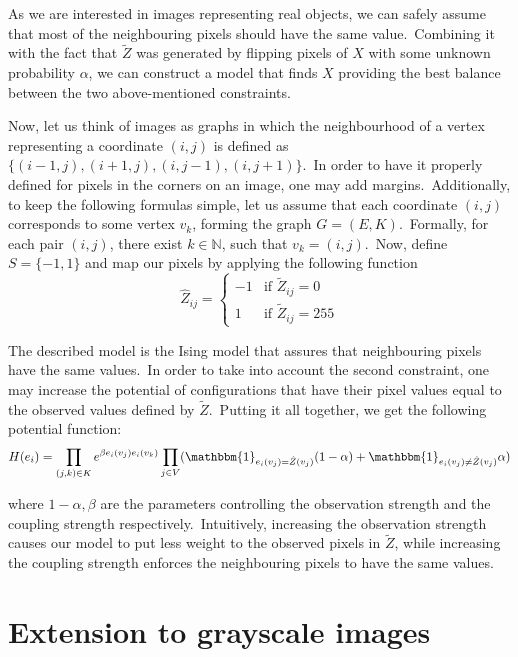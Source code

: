 \documentclass[shortabstract, english, lic]{iithesis}
\theoremstyle{default_theorem_style}\newtheorem{theorem}{Theorem}
\theoremstyle{default_theorem_style}\newtheorem{definition}{Definition}
\begin{document}
\noindent As we are interested in images representing real objects, we can safely assume that most of the neighbouring
pixels should have the same value.\ Combining it with the fact that $\tilde{Z}$ was generated by flipping pixels of
$X$ with some unknown probability $\alpha$, we can construct a model that finds $X$ providing the best balance between the
two above-mentioned constraints.\newline

\noindent Now, let us think of images as graphs in which the neighbourhood of a vertex representing a
coordinate $(i, j)$ is defined as $\{(i - 1, j), (i + 1, j), (i, j - 1), (i, j + 1)\}$.\ In
order to have it properly defined for pixels in the corners on an image, one may add margins.\ Additionally, to keep
the following formulas simple, let us assume that each coordinate $(i, j)$ corresponds to some
vertex $v_k$, forming the graph $G = (E, K)$.\ Formally, for each pair $(i, j)$, there exist
$k \in \mathbb{N}$, such that $v_k = (i, j)$.\ Now, define $S = \{-1, 1\}$ and map our pixels by applying the
following function
$$
\hat{Z}_{ij} =
\begin{cases}
  -1 &\text{if $\tilde{Z}_{ij} = 0$}\\
  1 &\text{if $\tilde{Z}_{ij} = 255$}
\end{cases}
$$

\noindent The described model is the Ising model that assures that neighbouring pixels have the same values.\ In order
to take into account the second constraint, one may increase the potential of configurations that have their pixel
values equal to the observed values defined by $\tilde{Z}$.\ Putting it all together, we get the following potential
function:
$$
H(e_i) = \prod\limits_{(j, k) \in K} e^{\beta e_i(v_j)e_i(v_k)}
\prod\limits_{j \in V}(\mathbbm{1}_{e_i(v_j) = \hat{Z}(v_j)}(1 - \alpha) +
\mathbbm{1}_{e_i(v_j) \neq \hat{Z}(v_j)}\alpha)
$$

\noindent where $1 - \alpha, \beta$ are the parameters controlling the observation strength and the coupling strength
respectively.\ Intuitively, increasing the observation strength causes our model to put less weight to the
observed pixels in $\tilde{Z}$, while increasing the coupling strength enforces the neighbouring pixels to have the
same values.

\section{Extension to grayscale images}
\end{document}
